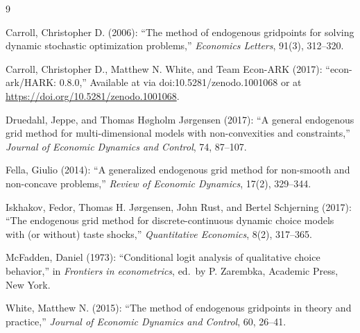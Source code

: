 \documentclass[11pt]{article}
\begin{document}

\begin{thebibliography}{9}

Carroll, Christopher D. (2006):
``The method of endogenous gridpoints for solving dynamic stochastic optimization problems,''
\textit{Economics Letters}, 91(3), 312--320.

Carroll, Christopher D., Matthew N. White, and Team Econ-ARK (2017):
``econ-ark/HARK: 0.8.0,''
Available at via doi:10.5281/zenodo.1001068 or at \url{https://doi.org/10.5281/zenodo.1001068}.

Druedahl, Jeppe, and Thomas H\o gholm J\o rgensen (2017):
``A general endogenous grid method for multi-dimensional models with non-convexities and constraints,''
\textit{Journal of Economic Dynamics and Control}, 74, 87--107.

Fella, Giulio (2014):
``A generalized endogenous grid method for non-smooth and non-concave problems,''
\textit{Review of Economic Dynamics}, 17(2), 329--344.

Iskhakov, Fedor, Thomas H. J\o rgensen, John Rust, and Bertel Schjerning (2017):
``The endogenous grid method for discrete-continuous dynamic choice models with (or without) taste shocks,''
\textit{Quantitative Economics}, 8(2), 317--365.

McFadden, Daniel (1973):
``Conditional logit analysis of qualitative choice behavior,''
in \textit{Frontiers in econometrics}, ed.\ by P. Zarembka, Academic Press, New York.

White, Matthew N. (2015):
``The method of endogenous gridpoints in theory and practice,''
\textit{Journal of Economic Dynamics and Control}, 60, 26--41.

\end{thebibliography}
\end{document}
